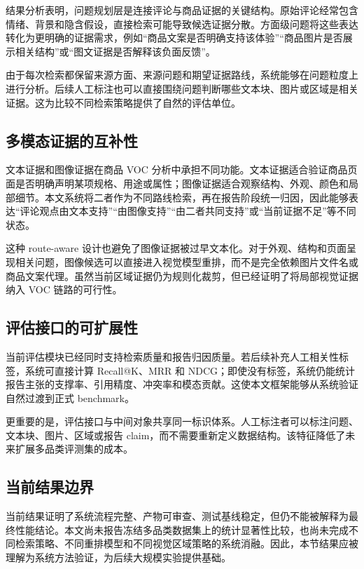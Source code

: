 \documentclass[11pt]{article}
\begin{document}
结果分析表明，问题规划层是连接评论与商品证据的关键结构。原始评论经常包含情绪、背景和隐含假设，直接检索可能导致候选证据分散。方面级问题将这些表达转化为更明确的证据需求，例如``商品文案是否明确支持该体验''``商品图片是否展示相关结构''或``图文证据是否解释该负面反馈''。

由于每次检索都保留来源方面、来源问题和期望证据路线，系统能够在问题粒度上进行分析。后续人工标注也可以直接围绕问题判断哪些文本块、图片或区域是相关证据。这为比较不同检索策略提供了自然的评估单位。

\subsection{多模态证据的互补性}

文本证据和图像证据在商品 VOC 分析中承担不同功能。文本证据适合验证商品页面是否明确声明某项规格、用途或属性；图像证据适合观察结构、外观、颜色和局部细节。本文系统将二者作为不同路线检索，再在报告阶段统一归因，因此能够表达``评论观点由文本支持''``由图像支持''``由二者共同支持''或``当前证据不足''等不同状态。

这种 route-aware 设计也避免了图像证据被过早文本化。对于外观、结构和页面呈现相关问题，图像候选可以直接进入视觉模型重排，而不是完全依赖图片文件名或商品文案代理。虽然当前区域证据仍为规则化裁剪，但已经证明了将局部视觉证据纳入 VOC 链路的可行性。

\subsection{评估接口的可扩展性}

当前评估模块已经同时支持检索质量和报告归因质量。若后续补充人工相关性标签，系统可直接计算 Recall@K、MRR 和 NDCG；即使没有标签，系统仍能统计报告主张的支撑率、引用精度、冲突率和模态贡献。这使本文框架能够从系统验证自然过渡到正式 benchmark。

更重要的是，评估接口与中间对象共享同一标识体系。人工标注者可以标注问题、文本块、图片、区域或报告 claim，而不需要重新定义数据结构。该特征降低了未来扩展多品类评测集的成本。

\subsection{当前结果边界}

当前结果证明了系统流程完整、产物可审查、测试基线稳定，但仍不能被解释为最终性能结论。本文尚未报告冻结多品类数据集上的统计显著性比较，也尚未完成不同检索策略、不同重排模型和不同视觉区域策略的系统消融。因此，本节结果应被理解为系统方法验证，为后续大规模实验提供基础。
\end{document}
